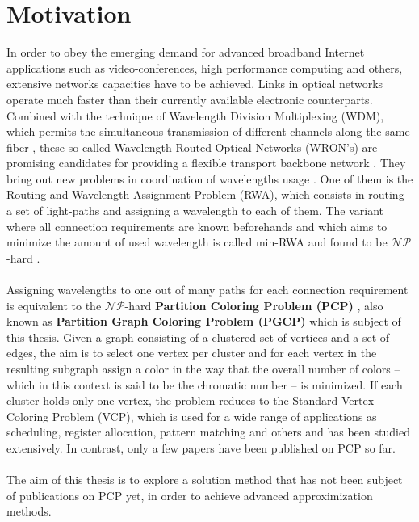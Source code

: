 \section{Motivation}

In order to obey the emerging demand for advanced broadband Internet applications such as video-conferences, high performance computing and others, extensive networks capacities have to be achieved. Links in optical networks operate much faster than their currently available electronic counterparts. Combined with the technique of Wavelength Division Multiplexing (WDM), which permits the simultaneous transmission of different channels along the same fiber \cite{noronha-06}, these so called Wavelength Routed Optical Networks (WRON's) are promising candidates for providing a flexible transport backbone network \cite{krishnaswamy-01}. They bring out new problems in coordination of wavelengths usage \cite{murthy-02}. One of them is the Routing and Wavelength Assignment Problem (RWA), which consists in routing a set of light-paths and assigning a wavelength to each of them. The variant where all connection requirements are known beforehands and which aims to minimize the amount of used wavelength is called min-RWA and found to be $\mathcal{NP}$-hard \cite{erlebach-01}.\\\\
Assigning wavelengths to one out of many paths for each connection requirement is equivalent to the $\mathcal{NP}$-hard \textbf{Partition Coloring Problem (PCP)} \cite{li-00}, also known as \textbf{Partition Graph Coloring Problem (PGCP)} which is subject of this thesis. Given a graph consisting of a clustered set of vertices and a set of edges, the aim is to select one vertex per cluster and for each vertex in the resulting subgraph assign a color in the way that the overall number of colors -- which in this context is said to be the chromatic number -- is minimized. If each cluster holds only one vertex, the problem reduces to the Standard Vertex Coloring Problem (VCP), which is used for a wide range of applications as scheduling, register allocation, pattern matching and others and has been studied extensively. In contrast, only a few papers have been published on PCP so far.\\\\
The aim of this thesis is to explore a solution method that has not been subject of publications on PCP yet,	in order to achieve advanced approximization methods.


